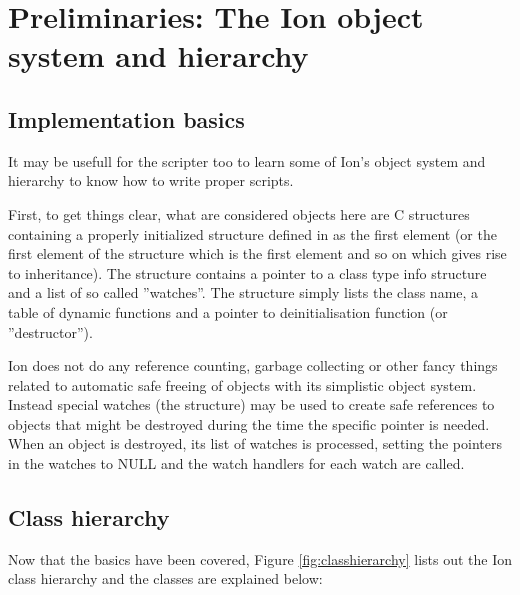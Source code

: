 
\section{Preliminaries: The Ion object system and hierarchy}

\subsection{Implementation basics}

It may be usefull for the scripter too to learn some of Ion's object
system and hierarchy to know how to write proper scripts.

First, to get things clear, what are considered objects here are C
structures containing a properly initialized \type{}
structure defined in  as the first element (or the
first element of the structure which is the first element and so on which
gives rise to inheritance). The  structure contains a pointer
to a  class type info structure and
a list of so called ''watches''. The  structure simply
lists the class name, a table of dynamic functions and a pointer to
deinitialisation function (or ''destructor'').

Ion does not do any reference counting, garbage collecting or other
fancy things related to automatic safe freeing of objects with its
simplistic object system. Instead special watches (the 
 structure) may be used to create safe references to
objects that might be destroyed during the time the specific pointer is
needed. When an object is destroyed, its list of watches is processed,
setting the pointers in the watches to NULL and the watch handlers for
each watch are called. 

\subsection{Class hierarchy}

Now that the basics have been covered, Figure \ref{fig:classhierarchy}
lists out the Ion class hierarchy and the classes are explained below:

